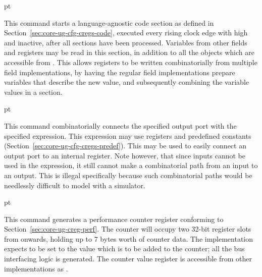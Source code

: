  pt
\codehead{\finally{}}

\noindent This command starts a language-agnostic code section as defined in 
Section~\ref{sec:core-ug-cfg-cregs-code}, executed every rising clock edge with 
 high and  inactive, after all \code{\implementation{}} 
sections have been processed. Variables from other fields and registers may be 
read in this section, in addition to all the objects which are accessible from 
\code{\implementation{}}. This allows registers to be written combinatorially
from multiple field implementations, by having the regular field implementations
prepare variables that describe the new value, and subsequently combining the
variable values in a \code{\finally{}} section.

 pt

\noindent This command combinatorially connects the specified output port with 
the specified expression. This expression may use registers and predefined 
constants (Section~\ref{sec:core-ug-cfg-cregs-predef}). This may be used to 
easily connect an output port to an internal register. Note however, that since 
inputs cannot be used in the expression, it still cannot make a combinatorial 
path from an input to an output. This is illegal specifically because such 
combinatorial paths would be needlessly difficult to model with a simulator.

 pt

\noindent This command generates a performance counter register conforming to 
Section~\ref{sec:core-ug-creg-perf}. The counter will occupy two 32-bit register 
slots from  onwards, holding up to 7 bytes worth of counter data. 
The implementation expects  to be set to the value which is to be 
added to the counter; all the bus interfacing logic is generated. The counter 
value register is accessible from other implementations as 
.
   
